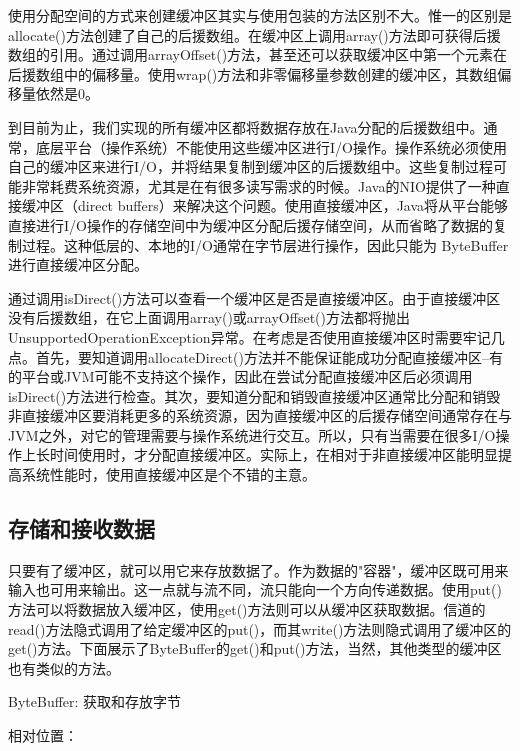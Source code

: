 		

		使用分配空间的方式来创建缓冲区其实与使用包装的方法区别不大。惟一的区别是allocate()方法创建了自己的后援数组。在缓冲区上调用array()方法即可获得后援数组的引用。通过调用arrayOffset()方法，甚至还可以获取缓冲区中第一个元素在后援数组中的偏移量。使用wrap()方法和非零偏移量参数创建的缓冲区，其数组偏移量依然是0。 

		到目前为止，我们实现的所有缓冲区都将数据存放在Java分配的后援数组中。通常，底层平台（操作系统）不能使用这些缓冲区进行I/O操作。操作系统必须使用自己的缓冲区来进行I/O，并将结果复制到缓冲区的后援数组中。这些复制过程可能非常耗费系统资源，尤其是在有很多读写需求的时候。Java的NIO提供了一种直接缓冲区（direct buffers）来解决这个问题。使用直接缓冲区，Java将从平台能够直接进行I/O操作的存储空间中为缓冲区分配后援存储空间，从而省略了数据的复制过程。这种低层的、本地的I/O通常在字节层进行操作，因此只能为 ByteBuffer进行直接缓冲区分配。 

		通过调用isDirect()方法可以查看一个缓冲区是否是直接缓冲区。由于直接缓冲区没有后援数组，在它上面调用array()或arrayOffset()方法都将抛出UnsupportedOperationException异常。在考虑是否使用直接缓冲区时需要牢记几点。首先，要知道调用allocateDirect()方法并不能保证能成功分配直接缓冲区--有的平台或JVM可能不支持这个操作，因此在尝试分配直接缓冲区后必须调用isDirect()方法进行检查。其次，要知道分配和销毁直接缓冲区通常比分配和销毁非直接缓冲区要消耗更多的系统资源，因为直接缓冲区的后援存储空间通常存在与JVM之外，对它的管理需要与操作系统进行交互。所以，只有当需要在很多I/O操作上长时间使用时，才分配直接缓冲区。实际上，在相对于非直接缓冲区能明显提高系统性能时，使用直接缓冲区是个不错的主意。 

	\subsection{存储和接收数据}

		只要有了缓冲区，就可以用它来存放数据了。作为数据的"容器"，缓冲区既可用来输入也可用来输出。这一点就与流不同，流只能向一个方向传递数据。使用put()方法可以将数据放入缓冲区，使用get()方法则可以从缓冲区获取数据。信道的read()方法隐式调用了给定缓冲区的put()，而其write()方法则隐式调用了缓冲区的get()方法。下面展示了ByteBuffer的get()和put()方法，当然，其他类型的缓冲区也有类似的方法。 

		ByteBuffer: 获取和存放字节 

		相对位置： 

		

